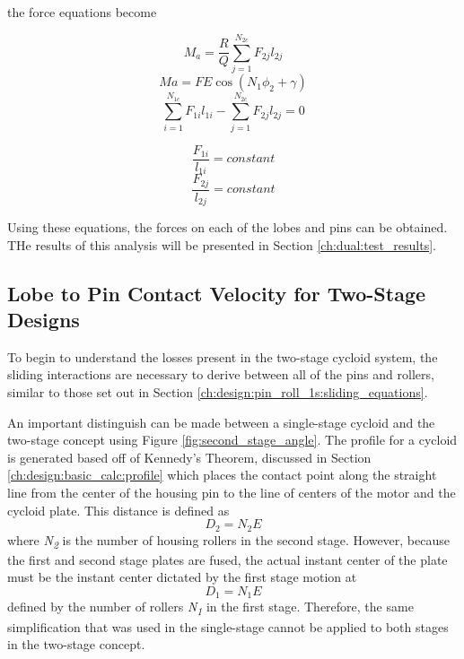 the force equations become 

\begin{equation} \label{eq:dual_power}
M_a = \frac{R}{Q} \sum_{j=1}^{N_{2c}} F_{2j} l_{2j}
\end{equation}
\begin{equation} \label{eq:dual_input}
Ma = F E \cos(N_1 \phi_2 + \gamma)
\end{equation}
\begin{equation} \label{eq:dual_torqe}
\sum_{i=1}^{N_{1c}}F_{1i} l_{1i} - \sum_{j=1}^{N_{2c}}F_{2j} l_{2j} = 0
\end{equation}

\begin{equation} 
\frac{F_{1i}}{l_{1i}} = constant 
\end{equation}
\begin{equation}
\frac{F_{2j}}{l_{2j}} = constant
\end{equation}

Using these equations, the forces on each of the lobes and pins can be obtained. THe results of this analysis will be presented in Section \ref{ch:dual:test_results}.

\subsection{Lobe to Pin Contact Velocity for Two-Stage Designs}\label{ch:dual:equations:vel}
To begin to understand the losses present in the two-stage cycloid system, the sliding interactions are necessary to derive between all of the pins and rollers, similar to those set out in Section \ref{ch:design:pin_roll_1s:sliding_equations}.

An important distinguish can be made between a single-stage cycloid and the two-stage concept using Figure \ref{fig:second_stage_angle}. The profile for a cycloid is generated based off of Kennedy's Theorem, discussed in Section \ref{ch:design:basic_calc:profile} which places the contact point along the straight line from the center of the housing pin to the line of centers of the motor and the cycloid plate. This distance is defined as 
\begin{equation}
D_2 = N_2 E
\end{equation} 
where \textit{N\textsubscript{2}} is the number of housing rollers in the second stage. However, because the first and second stage plates are fused, the actual instant center of the plate must be the instant center dictated by the first stage motion at 
\begin{equation}
D_1 = N_1 E 
\end{equation} 
defined by the number of rollers \textit{N\textsubscript{1}} in the first stage. Therefore, the same simplification that was used in the single-stage cannot be applied to both stages in the two-stage concept. 

